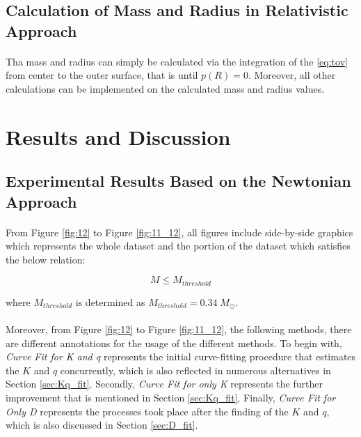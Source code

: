 \documentclass[letterpaper,12pt]{article}
\begin{document}
\subsection{Calculation of Mass and Radius in Relativistic Approach}
\paragraph{} Tha mass and radius can simply be calculated via the integration of the \eqref{eq:tov} from center to the outer surface, that is until $p(R) = 0$. Moreover, all other calculations can be implemented on the calculated mass and radius values.
\section{Results and Discussion}
\label{sec:resdis}
\subsection{Experimental Results Based on the Newtonian Approach}


\paragraph{} From Figure \ref{fig:12} to Figure \ref{fig:11_12}, all figures include side-by-side graphics which represents the whole dataset and the portion of the dataset which satisfies the below relation:

\begin{equation*}
    M \leq M_{threshold}
\end{equation*}

where $M_{threshold}$ is determined as $M_{threshold} = 0.34 \; M_\odot$.

\paragraph{} Moreover, from Figure \ref{fig:12} to Figure \ref{fig:11_12}, the following methods, there are different annotations for the usage of the different methods. To begin with, \textit{Curve Fit for K and q} represents the initial curve-fitting procedure that estimates the $K$ and $q$ concurrently, which is also reflected in numerous alternatives in Section \ref{sec:Kq_fit}. Secondly, \textit{Curve Fit for only K} represents the further improvement that is mentioned in Section \ref{sec:Kq_fit}. Finally, \textit{Curve Fit for Only D} represents the processes took place after the finding of the $K$ and $q$, which is also discussed in Section \ref{sec:D_fit}.
\end{document}
